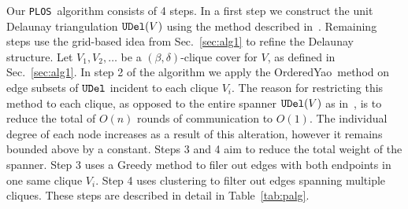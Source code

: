 \documentclass{llncs}
\newcommand{\palg}{{\tt PLOS}}
\newcommand{\udel}{{\tt UDel}}
\newcommand{\oyao}{{\sc OrderedYao}}
\begin{document}
Our \palg\ algorithm consists of 4 steps. In a first step we construct
the unit Delaunay triangulation $\udel(V)$ using the method described
in~\cite{LCWW03}. Remaining steps use the grid-based idea from Sec.~\ref{sec:alg1}
to refine the Delaunay structure.
Let $V_1, V_2, \ldots$ be a $(\beta, \delta)$-clique cover for $V$, as
defined in Sec.~\ref{sec:alg1}.
In step 2 of the algorithm we apply the \oyao\ method
on edge subsets of $\udel$ incident to each clique $V_i$. The reason for restricting
this method to each clique, as opposed to the entire spanner $\udel(V)$ as
in~\cite{WangLi03}, is
to reduce the total of $O(n)$ rounds of communication to $O(1)$. The individual
degree of each node increases as a result of this alteration, however it remains
bounded above by a constant.
Steps 3 and 4 aim to reduce the total weight of the spanner. Step 3 uses
a Greedy method to filer out edges with both endpoints in one same clique $V_i$.
Step 4 uses clustering to filter out edges spanning multiple cliques.
These steps are described in detail in Table~\ref{tab:palg}.
\end{document}
